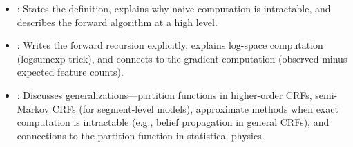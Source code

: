 \begin{interviewq}
\goodgreat
\begin{itemize}
    \item {}: States the definition, explains why naive computation
          is intractable, and describes the forward algorithm at a high level.
    \item {}: Writes the forward recursion explicitly, explains
          log-space computation (logsumexp trick), and connects to the gradient
          computation (observed minus expected feature counts).
    \item {}: Discusses generalizations---partition functions in
          higher-order CRFs, semi-Markov CRFs (for segment-level models),
          approximate methods when exact computation is intractable (e.g.,
          belief propagation in general CRFs), and connections to the
          partition function in statistical physics.
\end{itemize}

\end{interviewq}

\vspace{0.5em}

